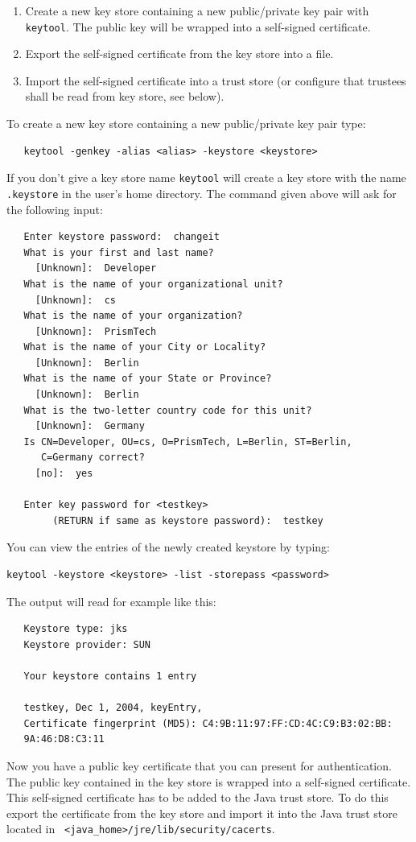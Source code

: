\begin{enumerate}
\item Create a new key store containing a new public/private key pair
with {\tt keytool}. The public key will be wrapped into a self-signed certificate.
\item Export the self-signed certificate from the key store into a file.
\item Import the self-signed certificate into a trust store
   (or configure that trustees shall be read from key store, see below).
\end{enumerate}
To create a new key store containing a new public/private key pair type:
\begin{verbatim}
   keytool -genkey -alias <alias> -keystore <keystore>
\end{verbatim}
If you don't give a key store name {\tt keytool} will create a key store with
the name {\tt .keystore} in the user's home directory. The command
given above will ask for the following input:
\begin{verbatim}
   Enter keystore password:  changeit
   What is your first and last name?
     [Unknown]:  Developer
   What is the name of your organizational unit?
     [Unknown]:  cs
   What is the name of your organization?
     [Unknown]:  PrismTech
   What is the name of your City or Locality?
     [Unknown]:  Berlin
   What is the name of your State or Province?
     [Unknown]:  Berlin
   What is the two-letter country code for this unit?
     [Unknown]:  Germany
   Is CN=Developer, OU=cs, O=PrismTech, L=Berlin, ST=Berlin,
      C=Germany correct?
     [no]:  yes

   Enter key password for <testkey>
        (RETURN if same as keystore password):  testkey
\end{verbatim}
You can view the entries of the newly created keystore by typing:
\begin{verbatim}
keytool -keystore <keystore> -list -storepass <password>
\end{verbatim}
The output will read for example like this:

\begin{verbatim}
   Keystore type: jks
   Keystore provider: SUN

   Your keystore contains 1 entry

   testkey, Dec 1, 2004, keyEntry,
   Certificate fingerprint (MD5): C4:9B:11:97:FF:CD:4C:C9:B3:02:BB:
   9A:46:D8:C3:11
\end{verbatim}

Now you have a public key certificate that you can present for
authentication. The public key contained in the key store is wrapped
into a self-signed certificate. This self-signed certificate has to be
added to the Java trust store. To do this export the certificate from
the key store and import it into the Java trust store located in {\tt
<java\_home>/jre/lib/security/cacerts}.

